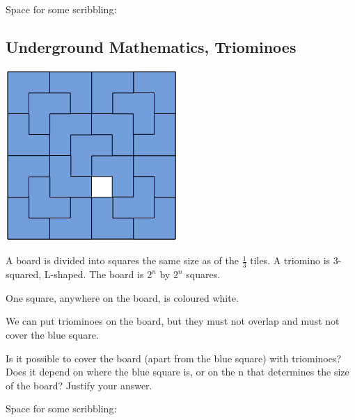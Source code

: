\documentclass[12pt]{article}
\begin{document}
Space for some scribbling:

\newpage
\subsection{Underground Mathematics, Triominoes}
\setlength{\parindent}{0pt}
\begin{center}
    \includegraphics[scale=0.55]{triominos.png}
\end{center}
A board is divided into squares the same size as of the $\frac 1 3$ tiles. A triomino is 3-squared, L-shaped. The board is $2^n$ by $2^n$ squares.

One square, anywhere on the board, is coloured white.

We can put triominoes on the board, but they must not overlap and must not cover the blue square.

Is it possible to cover the board (apart from the blue square) with triominoes? Does it depend on where the blue square is, or on the n that determines the size of the board? Justify your answer.

\setlength{\parindent}{4ex}
Space for some scribbling:
\end{document}
